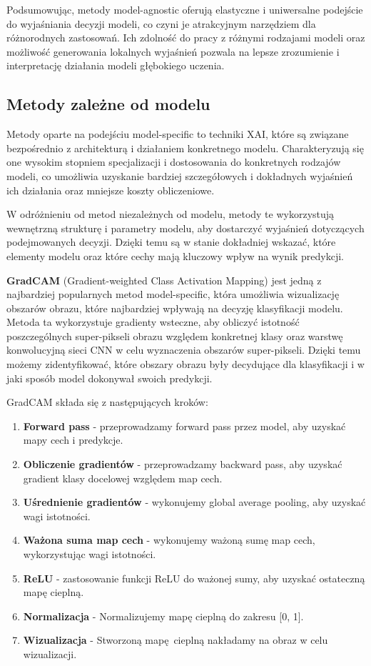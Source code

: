 \vspace{1cm}
Podsumowując, metody model-agnostic oferują elastyczne i uniwersalne podejście do wyjaśniania decyzji modeli, co czyni je atrakcyjnym narzędziem dla różnorodnych zastosowań.
Ich zdolność do pracy z różnymi rodzajami modeli oraz możliwość generowania lokalnych wyjaśnień pozwala na lepsze zrozumienie i interpretację działania modeli głębokiego uczenia.

\subsection*{Metody zależne od modelu}
Metody oparte na podejściu model-specific to techniki XAI, które są związane bezpośrednio z architekturą i działaniem konkretnego modelu.
Charakteryzują się one wysokim stopniem specjalizacji i dostosowania do konkretnych rodzajów modeli, co umożliwia uzyskanie bardziej szczegółowych i dokładnych wyjaśnień ich działania oraz mniejsze koszty obliczeniowe.

W odróżnieniu od metod niezależnych od modelu, metody te wykorzystują wewnętrzną strukturę i parametry modelu, aby dostarczyć wyjaśnień dotyczących podejmowanych decyzji.
Dzięki temu są w stanie dokładniej wskazać, które elementy modelu oraz które cechy mają kluczowy wpływ na wynik predykcji.

\textbf{GradCAM} \cite{Selvaraju_2019} (Gradient-weighted Class Activation Mapping) jest jedną z najbardziej popularnych metod model-specific, która umożliwia wizualizację obszarów obrazu, które najbardziej wpływają na decyzję klasyfikacji modelu.
Metoda ta wykorzystuje gradienty wsteczne, aby obliczyć istotność poszczególnych super-pikseli obrazu względem konkretnej klasy oraz warstwę konwolucyjną sieci CNN w celu wyznaczenia obszarów super-pikseli.
Dzięki temu możemy zidentyfikować, które obszary obrazu były decydujące dla klasyfikacji i w jaki sposób model dokonywał swoich predykcji.

GradCAM składa się z następujących kroków:
\begin{enumerate}
	\item \textbf{Forward pass} - przeprowadzamy forward pass przez model, aby uzyskać mapy cech i predykcje.
	\item \textbf{Obliczenie gradientów} - przeprowadzamy backward pass, aby uzyskać gradient klasy docelowej względem map cech.
	\item \textbf{Uśrednienie gradientów} - wykonujemy global average pooling, aby uzyskać wagi istotności.
	\item \textbf{Ważona suma map cech} - wykonujemy ważoną sumę map cech, wykorzystując wagi istotności.
	\item \textbf{ReLU} - zastosowanie funkcji ReLU do ważonej sumy, aby uzyskać ostateczną mapę cieplną.
	\item \textbf{Normalizacja} - Normalizujemy mapę cieplną do zakresu [0, 1].
  \item \textbf{Wizualizacja} - Stworzoną mapę cieplną nakładamy na obraz w celu wizualizacji.
\end{enumerate}

